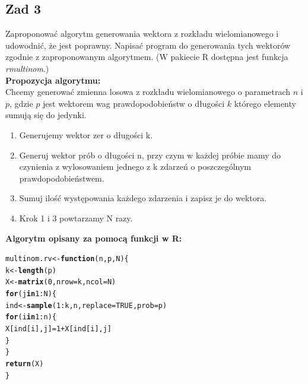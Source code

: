 \documentclass[12pt]{mwart}\usepackage[]{graphicx}\usepackage[]{color}
\makeatletter
\newcommand{\hlnum}[1]{\textcolor[rgb]{0.686,0.059,0.569}{#1}}%
\newcommand{\hlopt}[1]{\textcolor[rgb]{0,0,0}{#1}}%
\newcommand{\hlstd}[1]{\textcolor[rgb]{0.345,0.345,0.345}{#1}}%
\newcommand{\hlkwa}[1]{\textcolor[rgb]{0.161,0.373,0.58}{\textbf{#1}}}%
\newcommand{\hlkwb}[1]{\textcolor[rgb]{0.69,0.353,0.396}{#1}}%
\newcommand{\hlkwc}[1]{\textcolor[rgb]{0.333,0.667,0.333}{#1}}%
\newcommand{\hlkwd}[1]{\textcolor[rgb]{0.737,0.353,0.396}{\textbf{#1}}}%
\newenvironment{kframe}{%
 \def\at@end@of@kframe{}%
 \ifinner\ifhmode%
  \def\at@end@of@kframe{\end{minipage}}%
  \begin{minipage}{\columnwidth}%
 \fi\fi%
 \def\FrameCommand##1{\hskip\@totalleftmargin \hskip-\fboxsep
 \colorbox{shadecolor}{##1}\hskip-\fboxsep
     \hskip-\linewidth \hskip-\@totalleftmargin \hskip\columnwidth}%
 \MakeFramed {\advance\hsize-\width
   \@totalleftmargin\z@ \linewidth\hsize
   \@setminipage}}%
 {\par\unskip\endMakeFramed%
 \at@end@of@kframe}
\newenvironment{knitrout}{}{} %
\makeatother
\begin{document}
\subsection*{Zad 3}
Zaproponować algorytm generowania wektora z rozkładu wielomianowego i udowodnić, że jest poprawny. Napisać program do generowania tych wektorów zgodnie z zaproponowanym algorytmem. (W pakiecie R dostępna jest funkcja \textit{rmultinom}.) \\

\textbf{Propozycja algorytmu:}\\
Chcemy generować zmienna losowa z rozkładu wielomianowego o parametrach $n$ i $p$, gdzie $p$ jest wektorem wag prawdopodobieństw o długości $k$ którego elementy sumują się do jedynki.\\
  \begin{enumerate}
    \item Generujemy wektor zer o długości k.
    \item Generuj wektor prób o długości n, przy czym w każdej próbie mamy do czynienia z wylosowaniem jednego z k zdarzeń o poszczególnym prawdopodobieństwem.
    \item Sumuj ilość występowania każdego zdarzenia i zapisz je do wektora.
    \item Krok 1 i 3 powtarzamy N razy.
    \newline
  \end{enumerate}
\textbf{Algorytm opisany za pomocą funkcji w R:}
\begin{knitrout}
\color{fgcolor}\begin{kframe}
\begin{alltt}
\hlstd{multinom.rv} \hlkwb{<-}\hlkwa{function}\hlstd{(}\hlkwc{n}\hlstd{,} \hlkwc{p}\hlstd{,} \hlkwc{N}\hlstd{)\{}
  \hlstd{k} \hlkwb{<-} \hlkwd{length}\hlstd{(p)}
  \hlstd{X} \hlkwb{<-} \hlkwd{matrix}\hlstd{(}\hlnum{0}\hlstd{,} \hlkwc{nrow} \hlstd{= k,} \hlkwc{ncol} \hlstd{= N)}
  \hlkwa{for} \hlstd{(j} \hlkwa{in} \hlnum{1}\hlopt{:}\hlstd{N) \{}
    \hlstd{ind} \hlkwb{<-} \hlkwd{sample}\hlstd{(}\hlnum{1}\hlopt{:}\hlstd{k, n,} \hlkwc{replace} \hlstd{=} \hlnum{TRUE}\hlstd{,} \hlkwc{prob} \hlstd{= p)}
    \hlkwa{for} \hlstd{(i} \hlkwa{in} \hlnum{1}\hlopt{:}\hlstd{n) \{}
      \hlstd{X[ind[i],j]} \hlkwb{=} \hlnum{1} \hlopt{+} \hlstd{X[ind[i],j]}
    \hlstd{\}}
  \hlstd{\}}
  \hlkwd{return}\hlstd{(X)}
\hlstd{\}}
\end{alltt}
\end{kframe}
\end{knitrout}
\end{document}
